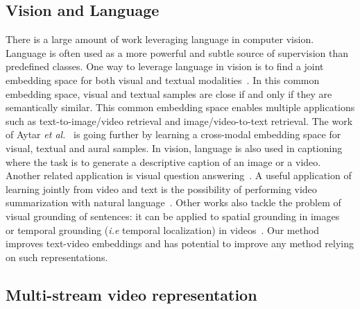 \documentclass[runningheads]{llncs}
\begin{document}
\subsection{Vision and Language}
There is a large amount of work leveraging language in computer vision. Language is often used as a more powerful and subtle source of supervision than predefined classes. One way to leverage language in vision is to find a joint embedding space for both visual and textual modalities~\cite{gong14multi,klein15associating,pan16jointly,plummer2017enhancing,xu2015jointly,wang2016learning,wang2018learning,wu2017sampling}. In this common embedding space, visual and textual samples are close if and only if they are semantically similar. This common embedding space enables multiple applications such as text-to-image/video retrieval and image/video-to-text retrieval. The work of Aytar \textit{et al.}~\cite{aytar17see} is going further by learning a cross-modal embedding space for visual, textual and aural samples. In vision, language is also used in captioning where the task is to generate a descriptive caption of an image or a video\cite{johnson16densecap,pan16hierarchical,you16image,yu2016video}. Another related application is visual question answering~\cite{fukui16multimodal,malinowski15ask,tapaswi16movieqa,yu17endtoend}. A useful application of learning jointly from video and text is the possibility of performing video summarization with natural language~\cite{plummer2017enhancing}. Other works also tackle the problem of visual grounding of sentences: it can be applied to spatial grounding in images~\cite{johnson16densecap,plummer2015flickr30k,plummer2017phrase} or temporal grounding (\textit{i.e} temporal localization) in videos~\cite{bojanowski15weakly,hendricks17localizing}. Our method improves text-video embeddings and has potential to improve any method relying on such representations.




\subsection{Multi-stream video representation}
\end{document}
